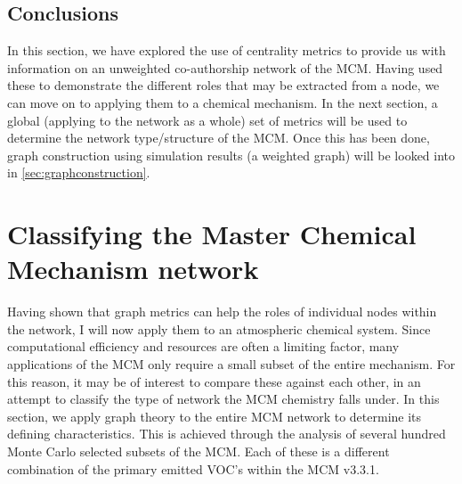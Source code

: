 \subsection{Conclusions}
In this section, we have explored the use of centrality metrics to provide us with information on an unweighted co-authorship network of the MCM. Having used these to demonstrate the different roles that may be extracted from a node, we can move on to applying them to a chemical mechanism. In the next section, a global (applying to the network as a whole) set of metrics will be used to determine the network type/structure of the MCM. Once this has been done, graph construction using simulation results (a weighted graph) will be looked into in \autoref{sec:graphconstruction}. 
% 
% 
% 
% 


\section{Classifying the Master Chemical Mechanism network}\label{sec:globalclass}

Having shown that graph metrics can help the roles of individual nodes within the network, I will now apply them to an atmospheric chemical system. Since computational efficiency and resources are often a limiting factor, many applications of the MCM only require a small subset of the entire mechanism. For this reason, it may be of interest to compare these against each other, in an attempt to classify the type of network the MCM chemistry falls under. In this section, we apply graph theory to the entire MCM network to determine its defining characteristics. This is achieved through the analysis of several hundred Monte Carlo selected subsets of the MCM. Each of these is a different combination of the primary emitted VOC's within the MCM v3.3.1.

